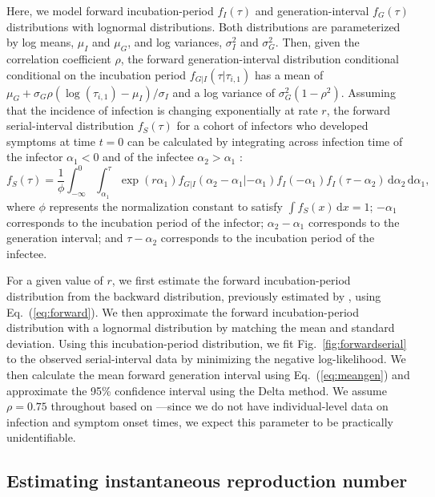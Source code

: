 \documentclass[12pt]{article}
\newcommand{\eref}[1]{Eq.~(\ref{eq:#1})}
\newcommand{\fref}[1]{Fig.~\ref{fig:#1}}
\newcommand{\dd}[1]{\ensuremath{\, \mathrm{d}#1}}
\newcommand{\dx}{\dd{x}}
\begin{document}
Here, we model forward incubation-period $f_I(\tau)$ and generation-interval $f_G(\tau)$ distributions with lognormal distributions.
Both distributions are parameterized by log means, $\mu_I$ and $\mu_G$, and log variances, $\sigma_I^2$ and $\sigma_G^2$.
Then, given the correlation coefficient $\rho$, the forward generation-interval distribution conditional conditional on the incubation period $f_{G|I}(\tau|\tau_{i,1})$ has a mean of $\mu_G + \sigma_G \rho (\log(\tau_{i, 1}) - \mu_I)/\sigma_I$ and a log variance of $\sigma_G^2 (1 - \rho^2)$.
Assuming that the incidence of infection is changing exponentially at rate $r$, the forward serial-interval distribution $f_S(\tau)$ for a cohort of infectors who developed symptoms at time $t = 0$ can be calculated by integrating across infection time of the infector $\alpha_1 < 0$ and of the infectee $\alpha_2 > \alpha_1$ \citep{park2021forward}:
\begin{equation}
f_S(\tau) = \frac{1}{\phi} \int_{-\infty}^0\int_{\alpha_1}^\tau \exp(r \alpha_1) f_{G|I}(\alpha_2 - \alpha_1|- \alpha_1) f_I(- \alpha_1) f_I(\tau - \alpha_2) \dd \alpha_2 \dd \alpha_1,
\label{eq:forwardserial}
\end{equation}
where $\phi$ represents the normalization constant to satisfy $\int f_S(x) \dx = 1$;
$-\alpha_1$ corresponds to the incubation period of the infector;
$\alpha_2 - \alpha_1$ corresponds to the generation interval;
and $\tau - \alpha_2$ corresponds to the incubation period of the infectee.

For a given value of $r$, we first estimate the forward incubation-period distribution from the backward distribution, previously estimated by \cite{backer2021omicron}, using \eref{forward}.
We then approximate the forward incubation-period distribution with a lognormal distribution by matching the mean and standard deviation.
Using this incubation-period distribution, we fit \fref{forwardserial} to the observed serial-interval data by minimizing the negative log-likelihood.
We then calculate the mean forward generation interval using \eref{meangen} and approximate the 95\% confidence interval using the Delta method.
We assume $\rho = 0.75$ throughout based on \cite{sender2021unmitigated}---since we do not have individual-level data on infection and symptom onset times, we expect this parameter to be practically unidentifiable.

\subsection{Estimating instantaneous reproduction number}
\end{document}
